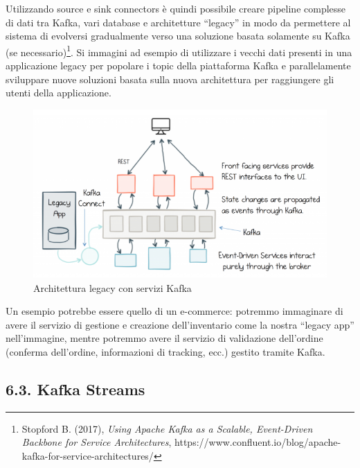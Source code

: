 \documentclass[]{article}
\begin{document}
Utilizzando source e sink connectors è quindi possibile creare pipeline
complesse di dati tra Kafka, vari database e architetture ``legacy'' in
modo da permettere al sistema di evolversi gradualmente verso una
soluzione basata solamente su Kafka (se necessario)\footnote{Stopford B.
  (2017), \emph{Using Apache Kafka as a Scalable, Event-Driven Backbone
  for Service Architectures},
  https://www.confluent.io/blog/apache-kafka-for-service-architectures/}.
Si immagini ad esempio di utilizzare i vecchi dati presenti in una
applicazione legacy per popolare i topic della piattaforma Kafka e
parallelamente sviluppare nuove soluzioni basata sulla nuova
architettura per raggiungere gli utenti della applicazione.

\begin{figure}
\centering
\includegraphics[width=1.05000\textwidth]{../images/legacy-kafka.png}
\caption{Architettura legacy con servizi Kafka \label{figure_5}}
\end{figure}

Un esempio potrebbe essere quello di un e-commerce: potremmo immaginare
di avere il servizio di gestione e creazione dell'inventario come la
nostra ``legacy app'' nell'immagine, mentre potremmo avere il servizio
di validazione dell'ordine (conferma dell'ordine, informazioni di
tracking, ecc.) gestito tramite Kafka.

\newpage

\subsection{6.3. Kafka Streams}\label{kafka-streams}
\end{document}
